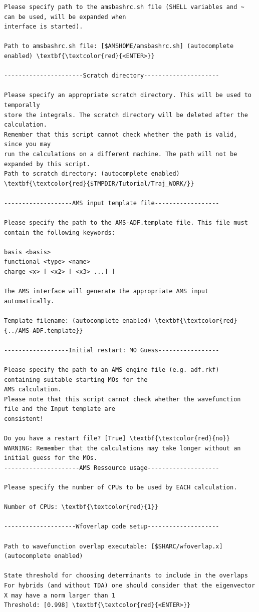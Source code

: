 \documentclass[a4paper,11pt,DIV=15,openany]{scrbook}
\begin{document}
\begin{oframed}
\begin{Verbatim}[commandchars=\\\{\}]
Please specify path to the amsbashrc.sh file (SHELL variables and ~ can be used, will be expanded when 
interface is started).

Path to amsbashrc.sh file: [$AMSHOME/amsbashrc.sh] (autocomplete enabled) \textbf{\textcolor{red}{<ENTER>}}

----------------------Scratch directory---------------------

Please specify an appropriate scratch directory. This will be used to temporally 
store the integrals. The scratch directory will be deleted after the calculation. 
Remember that this script cannot check whether the path is valid, since you may 
run the calculations on a different machine. The path will not be expanded by this script.
Path to scratch directory: (autocomplete enabled) \textbf{\textcolor{red}{$TMPDIR/Tutorial/Traj_WORK/}}

-------------------AMS input template file------------------

Please specify the path to the AMS-ADF.template file. This file must contain the following keywords:

basis <basis>
functional <type> <name>
charge <x> [ <x2> [ <x3> ...] ]

The AMS interface will generate the appropriate AMS input automatically.

Template filename: (autocomplete enabled) \textbf{\textcolor{red}{../AMS-ADF.template}}

------------------Initial restart: MO Guess-----------------

Please specify the path to an AMS engine file (e.g. adf.rkf) containing suitable starting MOs for the 
AMS calculation. 
Please note that this script cannot check whether the wavefunction file and the Input template are 
consistent!

Do you have a restart file? [True] \textbf{\textcolor{red}{no}}
WARNING: Remember that the calculations may take longer without an initial guess for the MOs.
---------------------AMS Ressource usage--------------------

Please specify the number of CPUs to be used by EACH calculation.

Number of CPUs: \textbf{\textcolor{red}{1}} 

--------------------Wfoverlap code setup--------------------

Path to wavefunction overlap executable: [$SHARC/wfoverlap.x] (autocomplete enabled) 

State threshold for choosing determinants to include in the overlaps
For hybrids (and without TDA) one should consider that the eigenvector X may have a norm larger than 1
Threshold: [0.998] \textbf{\textcolor{red}{<ENTER>}}


\end{Verbatim}
\end{oframed}
\end{document}
